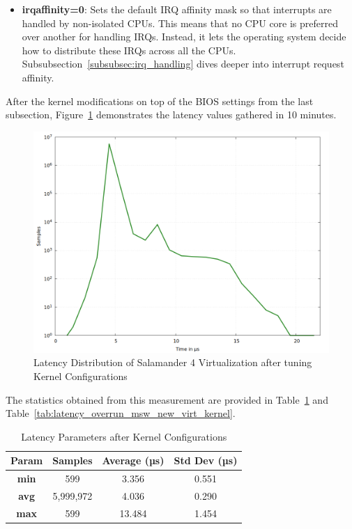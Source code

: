 \documentclass[MMR,Master,english]{style/twbook}
\begin{document}
\begin{itemize}
	\item \textbf{irqaffinity=0}: Sets the default IRQ affinity mask so that interrupts are handled by non-isolated CPUs. This means that no CPU core is preferred over another for handling IRQs. Instead, it lets the operating system decide how to distribute these IRQs across all the CPUs. Subsubsection~\ref{subsubsec:irq_handling} dives deeper into interrupt request affinity. 
\end{itemize}

\clearpage

\noindent After the kernel modifications on top of the BIOS settings from the last subsection, Figure~\ref{fig:gnuplot_max_latency_rt_kernelparam} demonstrates the latency values gathered in 10 minutes.

\begin{figure}[H]
	\centering
	\includegraphics[width=0.7\columnwidth]{img/implementation/gnuplot_max_latency_rt_kernelparam.png}
	\caption[Latency Distribution of Salamander 4 after Kernel Configurations]{Latency Distribution of Salamander 4 Virtualization after tuning Kernel Configurations}
	\label{fig:gnuplot_max_latency_rt_kernelparam}
\end{figure}

\noindent The statistics obtained from this measurement are provided in Table~\ref{tab:latency_stats_kernelparam} and Table~\ref{tab:latency_overrun_msw_new_virt_kernel}.

\begin{table}[H]
	\centering
	\caption{Latency Parameters after Kernel Configurations}
	\label{tab:latency_stats_kernelparam}
	\begin{tabular}{|c|c|c|c|}
		\hline
		\textbf{Param} & \textbf{Samples} & \textbf{Average (µs)} & \textbf{Std Dev (µs)} \\ \hline
		\textbf{min}   & 599              & 3.356                 & 0.551                 \\ \hline
		\textbf{avg}   & 5,999,972        & 4.036                 & 0.290                 \\ \hline
		\textbf{max}   & 599              & 13.484                & 1.454                 \\ \hline
	\end{tabular}
\end{table}
\end{document}
